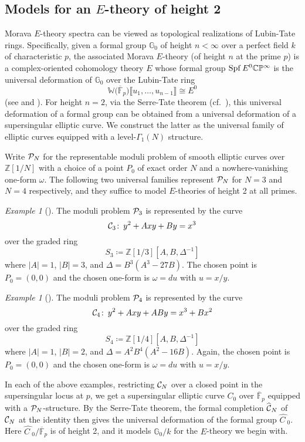 \documentclass{gtpart}
\theoremstyle{definition}
\theoremstyle{remark}
\newtheorem{ex}[thm]{Example}
\def\co{\colon\thinspace}
\newcommand{\mb}[1]{\mathbb{#1}}
\newcommand{\Spf}{{\rm Spf\thinspace}}
\newcommand{\cF}{\overline {\mb F}}
\newcommand{\CC}{{\cal C}}
\newcommand{\CP}{{\cal P}}
\newcommand{\BC}{{\mb C}}
\newcommand{\BG}{{\mb G}}
\newcommand{\BP}{{\mb P}}
\newcommand{\BW}{{\mb W}}
\newcommand{\BZ}{{\mb Z}}
\newcommand{\HC}{\widehat{C~}\!}
\newcommand{\HCC}{\widehat{~\!\!\CC}}
\renewcommand{\D}{\Delta}
\newcommand{\G}{\Gamma}
\renewcommand{\o}{\omega}
\newcommand{\ce}{\coloneqq}
\newcommand{\lb}{\llbracket}
\newcommand{\rb}{\rrbracket}
\renewcommand{\=}{\approx}
\renewcommand{\-}{\sim}
\numberwithin{equation}{section}
\numberwithin{thm}{section}
\begin{document}
\subsection{Models for an $E$-theory of height 2}
\label{subsec:model}

Morava $E$-theory spectra can be viewed as topological realizations of Lubin-Tate rings.  
Specifically, given a formal group $\BG_0$ of height $n < \infty$ over a perfect field $k$ of characteristic $p$, 
the associated Morava $E$-theory (of height $n$ at the prime $p$) is a complex-oriented 
cohomology theory $E$ whose formal group $\Spf E^0 \BC\BP^\infty$ is the 
universal deformation of $\BG_0$ over the Lubin-Tate ring 
\[
 \BW \big( \cF_p \big) \lb u_1, \ldots, u_{n - 1} \rb \cong E^0 
\]
(see \cite[Section 3]{LT} and \cite[Section 7]{GH}).  
For height $n = 2$, via the Serre-Tate theorem \cite{LST} (cf.~\cite[Theorem 2.9.1]{KM}), 
this universal deformation of a formal group can be obtained from a universal deformation of a supersingular 
elliptic curve.  We construct the latter as the universal family of elliptic curves equipped 
with a level-$\G_1(N)$ structure.  

Write $\CP_N$ for the representable moduli problem of smooth elliptic curves over $\BZ[1/N]$ 
with a choice of a point $P_0$ of exact order $N$ and a nowhere-vanishing one-form $\o$.  The 
following two universal families represent $\CP_N$ for $N = 3$ and $N = 4$ respectively, 
and they suffice to model $E$-theories of height 2 at all primes.  
\begin{ex}[{\cite[Proposition 3.2]{tmf3}}]
 \label{ex:3}
 The moduli problem $\CP_3$ is represented by the curve 
 \[
  \CC_3 \co y^2 + A x y + B y = x^3 
 \]
 over the graded ring 
 \[
  S_3 \ce \BZ[1/3][A, B, \D^{-1}] 
 \]
 where $|A| = 1$, $|B| = 3$, and $\D = B^3 (A^3 - 27 B)$.  The chosen point is $P_0 = (0,0)$ 
 and the chosen one-form is $\o = du$ with $u = x / y$.  
\end{ex}
\begin{ex}[{\cite[Proposition 2.1]{p3}}]
 \label{ex:4}
 The moduli problem $\CP_4$ is represented by the curve 
 \[
  \CC_4 \co y^2 + A x y + A B y = x^3 + B x^2 
 \]
 over the graded ring 
 \[
  S_4 \ce \BZ[1/4][A, B, \D^{-1}] 
 \]
 where $|A| = 1$, $|B| = 2$, and $\D = A^2 B^4 (A^2 - 16 B)$.  Again, the chosen point is 
 $P_0 = (0,0)$ and the chosen one-form is $\o = du$ with $u = x / y$.  
\end{ex}
In each of the above examples, restricting $\CC_N$ over a closed point in the supersingular locus at $p$, 
we get a supersingular elliptic curve $C_0$ over $\cF_p$ equipped with a $\CP_N$-structure.  
By the Serre-Tate theorem, the formal completion $\HCC_N$ of $\CC_N$ at the identity then gives the universal deformation of the formal group $\HC_0$.  
Here $\HC_0 / \cF_p$ is of height 2, and it models $\BG_0 / k$ for the $E$-theory we begin with.  
\end{document}
